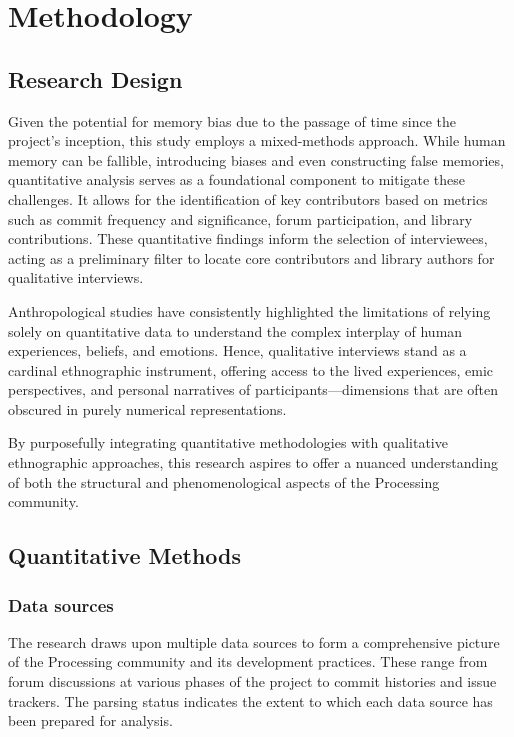 \documentclass{article}
\begin{document}
\section{Methodology}

\subsection{Research Design}
Given the potential for memory bias due to the passage of time since the project's inception, this study employs a mixed-methods approach. While human memory can be fallible, introducing biases and even constructing false memories, quantitative analysis serves as a foundational component to mitigate these challenges. It allows for the identification of key contributors based on metrics such as commit frequency and significance, forum participation, and library contributions. These quantitative findings inform the selection of interviewees, acting as a preliminary filter to locate core contributors and library authors for qualitative interviews.

Anthropological studies have consistently highlighted the limitations of relying solely on quantitative data to understand the complex interplay of human experiences, beliefs, and emotions. Hence, qualitative interviews stand as a cardinal ethnographic instrument, offering access to the lived experiences, emic perspectives, and personal narratives of participants—dimensions that are often obscured in purely numerical representations.

By purposefully integrating quantitative methodologies with qualitative ethnographic approaches, this research aspires to offer a nuanced understanding of both the structural and phenomenological aspects of the Processing community.

\subsection{Quantitative Methods}
\subsubsection*{Data sources}

The research draws upon multiple data sources to form a comprehensive picture of the Processing community and its development practices. These range from forum discussions at various phases of the project to commit histories and issue trackers. The parsing status indicates the extent to which each data source has been prepared for analysis. 
        
\end{document}
